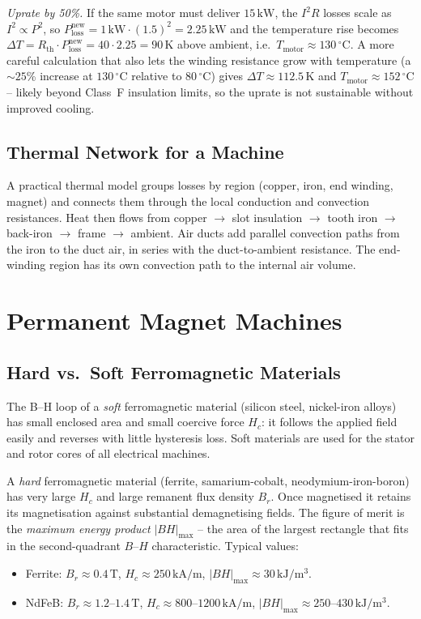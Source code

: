 \documentclass[12pt,a4paper]{article}
\newcommand{\unit}[1]{\ensuremath{\,\mathrm{#1}}}
\newcommand{\degree}{\ensuremath{^{\circ}}}
\begin{document}
\emph{Uprate by 50\%.} If the same motor must deliver $15\unit{kW}$,
the $I^2R$ losses scale as $I^2 \propto P^2$, so
$P_\text{loss}^{\text{new}} = 1\,\text{kW}\cdot(1.5)^2 = 2.25\unit{kW}$
and the temperature rise becomes $\Delta T = R_\text{th}\cdot
P_\text{loss}^{\text{new}} = 40 \cdot 2.25 = 90\unit{K}$ above
ambient, i.e.\ $T_\text{motor} \approx 130\unit{\degree C}$.
A more careful calculation that also lets the winding resistance grow
with temperature (a $\sim 25$\% increase at $130\unit{\degree C}$
relative to $80\unit{\degree C}$) gives
$\Delta T \approx 112.5\unit{K}$ and $T_\text{motor}\approx 152\unit{\degree C}$ --
likely beyond Class~F insulation limits, so the uprate is not
sustainable without improved cooling.

\subsection{Thermal Network for a Machine}

A practical thermal model groups losses by region (copper, iron,
end winding, magnet) and connects them through the local conduction
and convection resistances. Heat then flows from copper $\to$ slot
insulation $\to$ tooth iron $\to$ back-iron $\to$ frame $\to$ ambient.
Air ducts add parallel convection paths from the iron to the duct air,
in series with the duct-to-ambient resistance. The end-winding region
has its own convection path to the internal air volume.

\section{Permanent Magnet Machines}
\label{sec:pm}

\subsection{Hard vs.\ Soft Ferromagnetic Materials}

The B--H loop of a \emph{soft} ferromagnetic material (silicon steel,
nickel-iron alloys) has small enclosed area and small coercive force
$H_c$: it follows the applied field easily and reverses with little
hysteresis loss. Soft materials are used for the stator and rotor
cores of all electrical machines.

A \emph{hard} ferromagnetic material (ferrite, samarium-cobalt,
neodymium-iron-boron) has very large $H_c$ and large remanent flux
density $B_r$. Once magnetised it retains its magnetisation against
substantial demagnetising fields. The figure of merit is the
\emph{maximum energy product} $|BH|_\text{max}$ -- the area of the
largest rectangle that fits in the second-quadrant
$B$--$H$ characteristic.
Typical values:
\begin{itemize}[noitemsep]
  \item Ferrite: $B_r \approx 0.4\unit{T}$, $H_c\approx 250\unit{kA/m}$,
        $|BH|_\text{max}\approx 30\unit{kJ/m^3}$.
  \item NdFeB: $B_r\approx 1.2$--$1.4\unit{T}$,
        $H_c\approx 800$--$1200\unit{kA/m}$,
        $|BH|_\text{max}\approx 250$--$430\unit{kJ/m^3}$.
\end{itemize}
\end{document}
